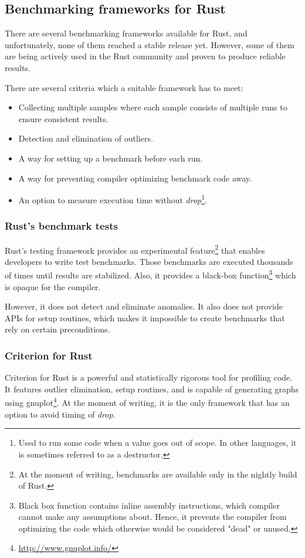 \subsection{Benchmarking frameworks for Rust}
There are several benchmarking frameworks available for Rust, and unfortunately, none of them reached a stable release yet. However, some of them are being actively used in the Rust community and proven to produce reliable results.

There are several criteria which a suitable framework has to meet:
\begin{itemize}
    \item Collecting multiple samples where each sample consists of multiple runs to ensure consistent results.
    \item Detection and elimination of outliers.
    \item A way for setting up a benchmark before each run.
    \item A way for preventing compiler optimizing benchmark code away.
    \item An option to measure execution time without \emph{drop}\footnote{Used to run some code when a value goes out of scope. In other languages, it is sometimes referred to as a destructor.}.
\end{itemize}

\subsubsection*{Rust's benchmark tests}
Rust's testing framework provides an experimental feature\footnote{At the moment of writing, benchmarks are available only in the nightly build of Rust.} that enables developers to write test benchmarks. Those benchmarks are executed thousands of times until results are stabilized. Also, it provides a black-box function\footnote{Black box function contains inline assembly instructions, which compiler cannot make any assumptions about. Hence, it prevents the compiler from optimizing the code which otherwise would be considered "dead" or unused.} which is opaque for the compiler.

However, it does not detect and eliminate anomalies. It also does not provide APIs for setup routines, which makes it impossible to create benchmarks that rely on certain preconditions.

\subsubsection*{Criterion for Rust}
Criterion for Rust is a powerful and statistically rigorous tool for profiling code. It features outlier elimination, setup routines, and is capable of generating graphs using gnuplot\footnote{\url{http://www.gnuplot.info/}}. At the moment of writing, it is the only framework that has an option to avoid timing of \emph{drop}.

